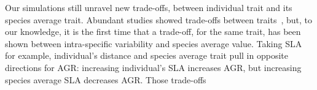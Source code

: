 Our simulations still unravel new trade-offs, between individual trait and its species average trait. Abundant studies showed trade-offs between traits~\cite{NEEDED}, but, to our knowledge, it is the first time that a trade-off, for the same trait, has been shown between intra-specific variability and species average value. Taking SLA for example, individual's distance and species average trait pull in opposite directions for AGR: increasing individual's SLA increases AGR, but increasing species average SLA decreases AGR. Those trade-offs 
